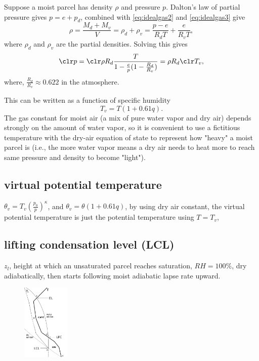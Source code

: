 \begin{derv*} Suppose a moist parcel has density $\rho$ and pressure $p$.
Dalton's law of partial pressure gives $p = e + p_d$, combined with \eqref{eq:idealgas2} and
\eqref{eq:idealgas3} give
\begin{equation}
   \rho = \frac{M_d + M_v}{V} = \rho_d + \rho_v = \frac{p-e}{R_dT} + \frac{e}{R_vT}, 
\end{equation}
where $\rho_d$ and $\rho_v$ are the partial densities.
Solving this gives
\begin{equation}
   {\clr p} = {\clr \rho} R_d \frac{T}{1-\frac{e}{p}(1-\frac{R_d}{R_v})} = \rho R_d {\clr T_v},
\end{equation}
where, $\frac{R_d}{R_v} \approx 0.622$ in the atmosphere. \\
\end{derv*}
This can be written as a function of specific humidity
\begin{equation}
   T_v = T(1 + 0.61q). 
\end{equation}
The gas constant for moist air (a mix of pure water vapor and dry air) depends strongly on the
amount of water vapor, so it is convenient to use a fictitious temperature with the dry-air equation
of state to represent how "heavy" a moist parcel is (i.e., the more water vapor means a dry air
needs to heat more to reach same pressure and density to become "light"). \\


\subsection{virtual potential temperature}
\begin{defn*}
$\theta_v = T_v (\frac{p_0}{p})^\kappa$, and $\theta_v = \theta(1+0.61q)$, by using dry air
constant, the virtual potential temperature is just the potential temperature using $T=T_v$, 
\end{defn*}




\subsection{lifting condensation level (LCL)}
\begin{defn*} $z_l$, height at which an unsaturated parcel reaches saturation, $RH=100\%$, dry
adiabatically, then starts following moist adiabatic lapse rate upward. 
\begin{figure} [H] 
   \includegraphics[width=0.2\textwidth, height=0.3\textwidth]{sounding.png}
   \caption{\label{sounding}}
\end{figure}
\end{defn*}

